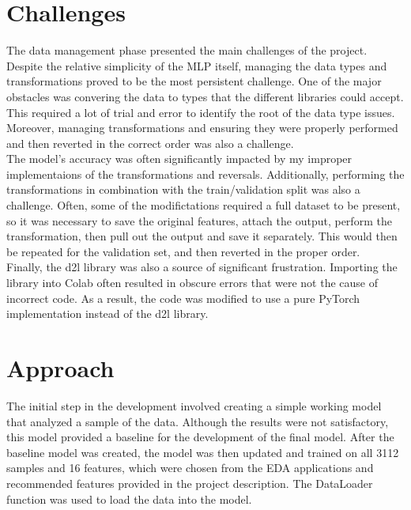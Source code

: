 \documentclass{article}[12pt]
\begin{document}
\section*{Challenges}

The data management phase presented the main challenges of the project. Despite the relative simplicity of the MLP itself, managing the data types and transformations proved to be the most persistent challenge.
\indent
One of the major obstacles was convering the data to types that the different libraries could accept. This required a lot of trial and error to identify the root of the data type issues. Moreover, managing transformations and ensuring they were properly performed and then reverted in the correct order was also a challenge.\\
\indent
The model's accuracy was often significantly impacted by my improper implementaions of the transformations and reversals. Additionally, performing the transformations in combination with the train/validation split was also a challenge. Often, some of the modifictations required a full dataset to be present, so it was necessary to save the original features, attach the output, perform the transformation, then pull out the output and save it separately. This would then be repeated for the validation set, and then reverted in the proper order.\\
\indent
Finally, the d2l library was also a source of significant frustration. Importing the library into Colab often resulted in obscure errors that were not the cause of incorrect code. As a result, the code was modified to use a pure PyTorch implementation instead of the d2l library.\\


\section*{Approach}

The initial step in the development involved creating a simple working model that analyzed a sample of the data. Although the results were not satisfactory, this model provided a baseline for the development of the final model. After the baseline model was created, the model was then updated and trained on all 3112 samples and 16 features, which were chosen from the EDA applications and recommended features provided in the project description. The DataLoader function was used to load the data into the model.\\
\end{document}
